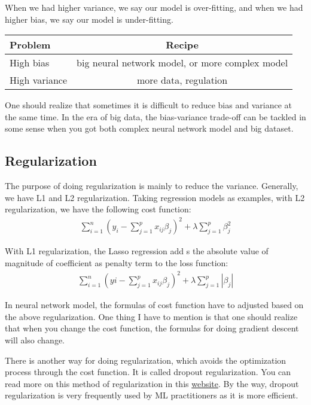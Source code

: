 \documentclass[12pt]{article}
\theoremstyle{definition}
\numberwithin{equation}{section}
\begin{document}
When we had higher variance, we say our model is over-fitting, and when we had higher bias, we say our model is under-fitting. 

\begin{table}[H]
	\centering
	\begin{tabular}{lc}
	\hline 
		Problem & Recipe \\
		\hline 
		High bias & big neural network model, or more complex model \\
		High variance & more data, regulation \\
		\hline 
	\end{tabular}
\end{table}

One should realize that sometimes it is difficult to reduce bias and variance at the same time. In the era of big data, the bias-variance trade-off can be tackled in some sense when you got both complex neural network model and big dataset. 


\subsection{Regularization}

The purpose of doing regularization is mainly to reduce the variance. Generally, we have L1 and L2 regularization. Taking regression models as examples, with L2 regularization, we have the following cost function:
\begin{align*}
	\sum_{i=1}^n (y_i - \sum_{j=1}^p x_{ij} \beta_j)^2 + \lambda \sum_{j=1}^p \beta_j^2 
\end{align*} 

With L1 regularization, the Lasso regression add s the absolute value of magnitude of coefficient as penalty term to the loss function:
\begin{align*}
	\sum_{i=1}^n (yi - \sum_{j=1}^p x_{ij} \beta_j)^2 + \lambda \sum_{j=1}^p |\beta_j|
\end{align*}

In neural network model, the formulas of cost function have to adjusted based on the above regularization. One thing I have to mention is that one should realize that when you change the cost function, the formulas for doing gradient descent will also change. 

There is another way for doing regularization, which avoids the optimization process through the cost function. It is called dropout regularization. You can read more on this method of regularization in this \href{https://cs231n.github.io/neural-networks-2/}{website}. By the way, dropout regularization is very frequently used by ML practitioners as it is more efficient. 
\end{document}
